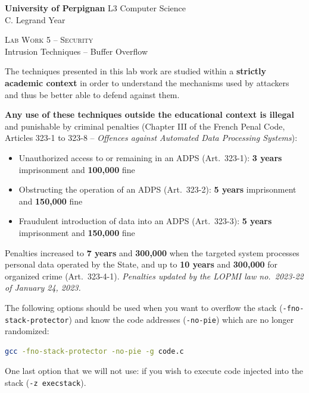 \documentclass[a4paper,11pt]{article}
\theoremstyle{plain}
\theoremstyle{definition}
\begin{document}
\hbox{}
\noindent \textbf{University of Perpignan} \hfill  L3 Computer Science \\
 \hfill C. Legrand \hfill  Year \the\year \\
\smallskip
\begin{center}
{
  {\scshape \large Lab Work 5 -- Security}  \\
 Intrusion Techniques -- Buffer Overflow
}
\end{center}
\hbox{}

\bigskip

\begin{ethique}
The techniques presented in this lab work are studied within a \textbf{strictly academic context} in order to understand the mechanisms used by attackers and thus be better able to defend against them.

\textbf{Any use of these techniques outside the educational context is illegal} and punishable by criminal penalties (Chapter III of the French Penal Code, Articles 323-1 to 323-8 -- \textit{Offences against Automated Data Processing Systems}):
\begin{itemize}
    \item Unauthorized access to or remaining in an ADPS (Art.~323-1): \textbf{3 years} imprisonment and \textbf{\texteuro{}100,000} fine
    \item Obstructing the operation of an ADPS (Art.~323-2): \textbf{5 years} imprisonment and \textbf{\texteuro{}150,000} fine
    \item Fraudulent introduction of data into an ADPS (Art.~323-3): \textbf{5 years} imprisonment and \textbf{\texteuro{}150,000} fine
\end{itemize}
Penalties increased to \textbf{7 years} and \textbf{\texteuro{}300,000} when the targeted system processes personal data operated by the State, and up to \textbf{10 years} and \textbf{\texteuro{}300,000} for organized crime (Art.~323-4-1). \textit{Penalties updated by the LOPMI law no.~2023-22 of January 24, 2023.}
\end{ethique}

\bigskip

\begin{tcolorbox}[colback=gray!5!white, colframe=gray!60!black, title={Compilation Options}]
The following options should be used when you want to overflow the stack (\texttt{-fno-stack-protector}) and know the code addresses (\texttt{-no-pie}) which are no longer randomized:
\begin{lstlisting}[language=bash,numbers=none]
gcc -fno-stack-protector -no-pie -g code.c
\end{lstlisting}
One last option that we will not use: if you wish to execute code injected into the stack (\texttt{-z execstack}).
\end{tcolorbox}
\end{document}
